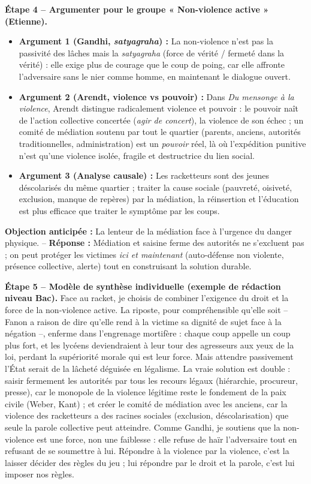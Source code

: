 \documentclass[11pt]{article}
\begin{document}
\begin{exoresolu}
\textbf{Étape 4 -- Argumenter pour le groupe « Non-violence active » (Etienne).}
\begin{itemize}
\item \textbf{Argument 1 (Gandhi, \emph{satyagraha}) :} La non-violence n'est pas la passivité des lâches mais la \emph{satyagraha} (force de vérité / fermeté dans la vérité) : elle exige plus de courage que le coup de poing, car elle affronte l'adversaire sans le nier comme homme, en maintenant le dialogue ouvert.
\item \textbf{Argument 2 (Arendt, violence vs pouvoir) :} Dans \emph{Du mensonge à la violence}, Arendt distingue radicalement violence et pouvoir : le pouvoir naît de l'action collective concertée (\emph{agir de concert}), la violence de son échec ; un comité de médiation soutenu par tout le quartier (parents, anciens, autorités traditionnelles, administration) est un \emph{pouvoir} réel, là où l'expédition punitive n'est qu'une violence isolée, fragile et destructrice du lien social.
\item \textbf{Argument 3 (Analyse causale) :} Les racketteurs sont des jeunes déscolarisés du même quartier ; traiter la cause sociale (pauvreté, oisiveté, exclusion, manque de repères) par la médiation, la réinsertion et l'éducation est plus efficace que traiter le symptôme par les coups.
\end{itemize}
\textbf{Objection anticipée :} La lenteur de la médiation face à l'urgence du danger physique. -- \textbf{Réponse :} Médiation et saisine ferme des autorités ne s'excluent pas ; on peut protéger les victimes \emph{ici et maintenant} (auto-défense non violente, présence collective, alerte) tout en construisant la solution durable.

\textbf{Étape 5 -- Modèle de synthèse individuelle (exemple de rédaction niveau Bac).}
\guillemotleft Face au racket, je choisis de combiner l'exigence du droit et la force de la non-violence active. La riposte, pour compréhensible qu'elle soit -- Fanon a raison de dire qu'elle rend à la victime sa dignité de sujet face à la négation --, enferme dans l'engrenage mortifère : chaque coup appelle un coup plus fort, et les lycéens deviendraient à leur tour des agresseurs aux yeux de la loi, perdant la supériorité morale qui est leur force. Mais attendre passivement l'État serait de la lâcheté déguisée en légalisme. La vraie solution est double : saisir fermement les autorités par tous les recours légaux (hiérarchie, procureur, presse), car le monopole de la violence légitime reste le fondement de la paix civile (Weber, Kant) ; et créer le comité de médiation avec les anciens, car la violence des racketteurs a des racines sociales (exclusion, déscolarisation) que seule la parole collective peut atteindre. Comme Gandhi, je soutiens que la non-violence est une force, non une faiblesse : elle refuse de haïr l'adversaire tout en refusant de se soumettre à lui. Répondre à la violence par la violence, c'est la laisser décider des règles du jeu ; lui répondre par le droit et la parole, c'est lui imposer nos règles. \guillemotright
\end{exoresolu}
\end{document}
